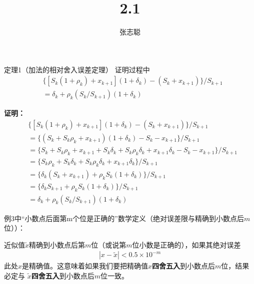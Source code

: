\documentclass{article}
\begin{document}
\title{2.1}
\author{张志聪}
\maketitle

\begin{zremark}
  定理1（加法的相对舍入误差定理） 证明过程中
  \begin{align*}
     & \{[S_k(1 + \rho_k) + x_{k + 1}](1 + \delta_k) - (S_k + x_{k + 1})\} / S_{k + 1} \\
     & = \delta_k + \rho_k(S_k / S_{k + 1}) (1 + \delta_k)
  \end{align*}
\end{zremark}

\textbf{证明：}
\begin{align*}
   & \{[S_k(1 + \rho_k) + x_{k + 1}](1 + \delta_k) - (S_k + x_{k + 1})\} / S_{k + 1}                                              \\
   & = \{ (S_k + S_k \rho_k + x_{k + 1}) (1 + \delta_k) - S_k - x_{k + 1} \} / S_{k + 1}                                          \\
   & = \{ S_k + S_k \rho_k + x_{k + 1} + S_k \delta_k + S_k \rho_k \delta_k + x_{k + 1} \delta_k - S_k - x_{k + 1} \} / S_{k + 1} \\
   & = \{ S_k \rho_k + S_k \delta_k + S_k \rho_k \delta_k + x_{k + 1} \delta_k \} / S_{k + 1}                                     \\
   & = \{ \delta_k(S_k + x_{k + 1}) + \rho_k S_k  ( 1 + \delta_k) \} / S_{k + 1}                                                  \\
   & = \{ \delta_k S_{k+1} + \rho_k S_k  ( 1 + \delta_k) \} / S_{k + 1}                                                           \\
   & = \delta_k + \rho_k(S_k / S_{k + 1}) (1 + \delta_k)
\end{align*}

\begin{zremark}
  例3中“小数点后面第m个位是正确的”数学定义（绝对误差限与精确到小数点后$m$位））：

  近似值$\tilde{x}$精确到小数点后第$m$位（或说第$m$位小数是正确的），如果其绝对误差
  \begin{align*}
    |x - \tilde{x}| < 0.5 \times 10^{-m}
  \end{align*}
  此处$x$是精确值。这意味着如果我们要把精确值$x$\textbf{四舍五入}到小数点后$m$位，结果必定与
  $\tilde{x}$\textbf{四舍五入}到小数点后$m$位一致。
\end{zremark}
\end{document}
